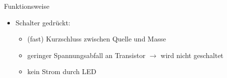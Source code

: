 \begin{frame}
\begin{columns}[c]
\begin{block}{Funktionsweise}
\begin{itemize}
\begin{itemize}
            \end{itemize}
            \pause
            \item Schalter gedrückt:
            \begin{itemize}
                \item (fast) Kurzschluss zwischen Quelle und Masse
                \item geringer Spannungsabfall an Transistor $\rightarrow$ wird
                nicht geschaltet
                \item kein Strom durch LED
            \end{itemize}
        \end{itemize}
    \end{block}
    \end{columns}
\end{frame}

